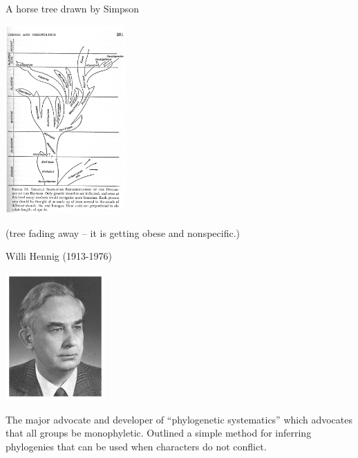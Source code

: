\documentclass[pdf,bluish,slideColor,colorBG]{prosper}
\begin{document}
\begin{slide}[Replace]{A horse tree drawn by Simpson}

\centerline{\includegraphics[width=1.8in]{horses.ps}}
\medskip

\centerline{(tree fading away -- it is getting obese and nonspecific.)}

\end{slide}

\begin{slide}[Replace]{Willi Hennig (1913-1976) }

\centerline{\includegraphics[width=1.5in]{Hennig3.ps}}
\medskip

The major advocate and developer of ``phylogenetic systematics'' which
advocates that all groups be monophyletic.  Outlined a simple method
for inferring phylogenies that can be used when characters do not conflict.

\end{slide}
\end{document}
